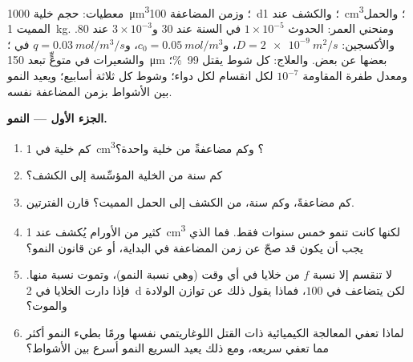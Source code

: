 \begin{problem}
\label{pb:b3:cancer-biology:1}
معطيات: حجم خلية  \qty{1000}{\micro m^3}؛ وزمن المضاعفة
\qty{100}{d}؛ والكشف عند \qty{1}{cm^3}؛ والحمل المميت \qty{1}{kg}.
ومنحني العمر: الحدوث $1\times 10^{-5}$ في السنة عند $30$ و$3\times
10^{-3}$ عند $80$. والأكسجين: $D = \qty{2e-9}{m^2/s}$، و$c_{0} =
\qty{0.05}{mol/m^3}$، و$q = \qty{0.03}{mol/m^3/s}$ في ؛ والشعيرات
في  متوعٍّ تبعد \qty{150}{\micro m} بعضها عن بعض. والعلاج: كل
شوط يقتل \qty{99}{\%}؛ ومعدل طفرة المقاومة $10^{-7}$ لكل
انقسام لكل دواء؛ وشوط كل ثلاثة أسابيع؛ ويعيد  النمو
بين الأشواط بزمن المضاعفة نفسه.

\medskip
\noindent\textbf{الجزء الأول --- النمو.}
\begin{enumerate}
  \item كم خلية في \qty{1}{cm^3}؟ وكم مضاعفةً من خلية
        واحدة؟
  \item كم سنة من الخلية المؤسِّسة إلى الكشف؟
  \item كم مضاعفةً، وكم سنة، من الكشف إلى الحمل
        المميت؟ قارن الفترتين.
  \item كثير من الأورام يُكشف عند \qty{1}{cm^3} لكنها كانت تنمو
        خمس سنوات فقط. فما الذي يجب أن يكون قد صحّ عن زمن المضاعفة
        في البداية، أو عن قانون النمو؟
  \item لا تنقسم إلا نسبة $f$ من خلايا  في أي
        وقت (وهي نسبة النمو)، وتموت نسبة منها. فإذا دارت الخلايا
        في \qty{2}{d} لكن  يتضاعف في $100$، فماذا يقول
        ذلك عن توازن الولادة والموت؟
  \item لماذا تعفي المعالجة الكيميائية ذات القتل اللوغاريتمي نفسها ورمًا بطيء
        النمو أكثر مما تعفي سريعه، ومع ذلك يعيد السريع
        النمو أسرع بين الأشواط؟
\end{enumerate}


\end{problem}
